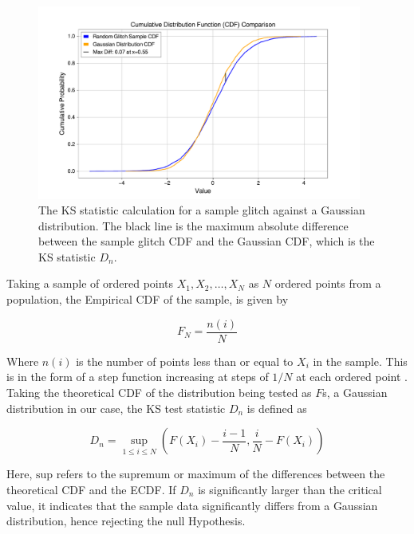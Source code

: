 \documentclass[12pt]{article}
\begin{document}
\begin{figure}[H]
    \centering
    \includegraphics[width=0.95\textwidth]{images/cdf_comparison_glitch_gaussian.pdf}
    \caption{The KS statistic calculation for a sample glitch against a Gaussian distribution. The black line is the maximum absolute difference between the sample glitch CDF and the Gaussian CDF, which is the KS statistic $D_n$.}
    \label{fig:ecdf_cdf_comparison}
\end{figure}

\medskip
\noindent  Taking a sample of ordered points $X_1, X_2, \ldots, X_N$ as $N$ ordered points from a population, the Empirical CDF of the sample, is given by

\begin{equation}
    F_N = \frac{n(i)}{N}
    \label{eq:edf}
\end{equation}

\medskip
\noindent Where $n(i)$ is the number of points less than or equal to $X_i$ in the sample. This is in the form of a step function increasing at steps of $1/N$ at each ordered point \cite{guthrie_nistsematech_2020}. Taking the theoretical CDF of the distribution being tested as $F$s, a Gaussian distribution in our case, the KS test statistic $D_n$ is defined as

\begin{equation}
    D_n = \sup_{1 \leq i \leq N} \left( F(X_i) - \frac{i - 1}{N} , \frac{i}{N} - F(X_i) \right)
    \label{eq:ks_statistic}
\end{equation}

\medskip
\noindent Here,  $\text{sup}$ refers to the supremum or maximum of the differences between the theoretical CDF and the ECDF. If $D_n$ is significantly larger than the critical value, it indicates that the sample data significantly differs from a Gaussian distribution, hence rejecting the null Hypothesis.
\end{document}
